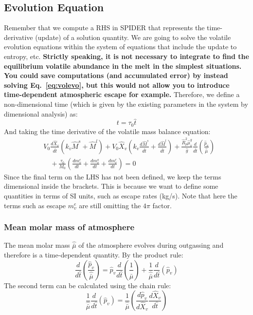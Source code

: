 \subsection{Evolution Equation}
Remember that we compute a RHS in SPIDER that represents the time-derivative (update) of a solution quantity.  We are going to solve the volatile evolution equations within the system of equations that include the update to entropy, etc.  \textbf{Strictly speaking, it is not necessary to integrate to find the equilibrium volatile abundance in the melt in the simplest situations.  You could save computations (and accumulated error) by instead solving Eq.~\ref{eq:volevo}, but this would not allow you to introduce time-dependent atmospheric escape for example.}  Therefore, we define a non-dimensional time (which is given by the existing parameters in the system by dimensional analysis) as:
\begin{equation}
t = \tau_0 \hat{t}
\end{equation}
And taking the time derivative of the volatile mass balance equation:
\begin{align}
&V_0 \frac{d \hat{X}_v}{d \hat{t}} (k_v \hat{M}^s + \hat{M}^l) +
V_0 \hat{X}_v \left( k_v \frac{d \hat{M}^s}{d \hat{t}} + \frac{d \hat{M}^l}{d \hat{t}} \right) + 
\frac{\hat{R}_p^2 \hat{\mu}_v^g}{\hat{g}} \frac{d}{d\hat{t}} \left( \frac{\hat{p}_v}{\hat{\bar{\mu}}} \right)\\
&\quad + \frac{\tau_0}{M_0} \left( \frac{dm_v^e}{dt} +  \frac{dm_v^o}{dt} + \frac{dm_v^r}{dt} \right) = 0
\end{align}
Since the final term on the LHS has not been defined, we keep the terms dimensional inside the brackets.  This is because we want to define some quantities in terms of SI units, such as escape rates (kg/s).  Note that here the terms such as escape $m_v^e$ are still omitting the $4 \pi$ factor.
\subsubsection{Mean molar mass of atmosphere}
The mean molar mass $\hat{\bar{\mu}}$ of the atmosphere evolves during outgassing and therefore is a time-dependent quantity.  By the product rule:
\begin{equation}
\frac{d}{d\hat{t}} \left( \frac{\hat{p}_v}{\hat{\bar{\mu}}} \right) = \hat{p}_v \frac{d}{d\hat{t}} \left( \frac{1}{\hat{\bar{\mu}}} \right) + \frac{1}{\hat{\bar{\mu}}} \frac{d}{d\hat{t}} \left( \hat{p}_v \right)
\label{eq:atmos_evo}
\end{equation}
The second term can be calculated using the chain rule:
\begin{equation}
\frac{1}{\hat{\bar{\mu}}} \frac{d}{d\hat{t}} \left( \hat{p}_v \right) = \frac{1}{\hat{\bar{\mu}}} \left( \frac{d \hat{p}_v}{d \hat{X}_v} \frac{d \hat{X}_v}{d\hat{t}} \right)
\end{equation}
